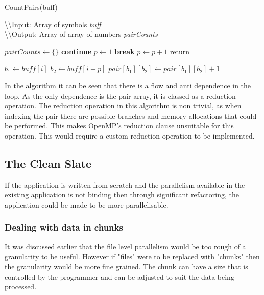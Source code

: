\documentclass{article}
\begin{document}
\begin{algorithm}[H]
    \caption{CountPairs(buff)} \label{alg:countpairs}
    \textbackslash \textbackslash Input: Array of symbols \textit{buff} \\
    \textbackslash \textbackslash Output: Array of array of numbers \textit{pairCounts}
    \begin{algorithmic}[1]
        \State $pairCounts \gets \{\}$
                \State \textbf{continue}
            \EndIf
            \State $p \gets 1$
                    \State \textbf{break}
                \EndIf
                \State $p \gets p + 1$ 
            \EndWhile
                \State $\text{return} {}$
            \EndIf

            \State $b_1 \gets buff[i]$
            \State $b_2 \gets buff[i+p]$
            \State $pair[b_1][b_2] \gets pair[b_1][b_2] + 1$
        \EndFor
    \end{algorithmic}
\end{algorithm}

In the algorithm it can be seen that there is a flow and anti dependence in the loop.
As the only dependence is the pair array, it is classed as a reduction operation.
The reduction operation in this algorithm is non trivial, as when indexing the pair there are 
possible branches and memory allocations that could be performed. This makes OpenMP's reduction clause
unsuitable for this operation. This would require a custom reduction operation to be implemented.

\subsection{The Clean Slate}

If the application is written from scratch and the parallelism available in the existing application is not
binding then through significant refactoring, the application could be made to be more parallelisable.

\subsubsection{Dealing with data in chunks}
It was discussed earlier that the file level parallelism would be too rough of a granularity to be useful.
However if "files" were to be replaced with "chunks" then the granularity would be more fine grained. The chunk
can have a size that is controlled by the programmer and can be adjusted to suit the data being processed.
\end{document}

